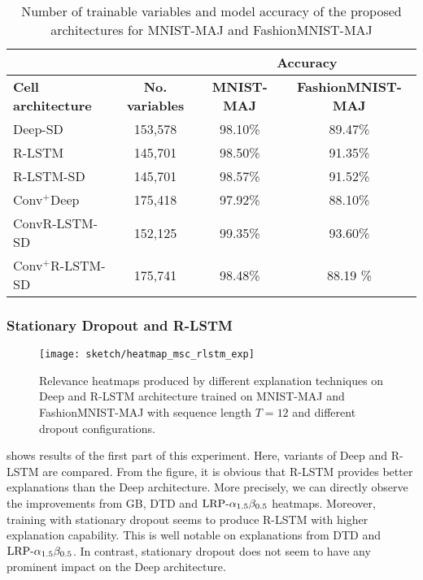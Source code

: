 \renewcommand{\arraystretch}{1.5}
\begin{table}[h]
\begin{center}
\begin{tabular}{lc|c|c|}
\cline{3-4}
& &
\multicolumn{2}{c|}{\parbox{3.5cm}{ \vskip 1mm \centering \textbf{Accuracy} \vskip 1mm}} \\ \hline
\multicolumn{1}{|l|}{\textbf{Cell architecture}} & \textbf{No. variables} & \textbf{MNIST-MAJ} & \textbf{FashionMNIST-MAJ} \\ \hline
\multicolumn{1}{|l|}{Deep-SD}                  & 153,578             & 98.10\% & 89.47\% \\ 
\multicolumn{1}{|l|}{R-LSTM}                    & 145,701   & 98.50\% & 91.35\% \\ 
\multicolumn{1}{|l|}{R-LSTM-SD}              &  145,701                & 98.57\% & 91.52\% \\ 
 \multicolumn{1}{|l|}{Conv$^+$Deep}       & 175,418                 & 97.92\% & 88.10\% \\
 \multicolumn{1}{|l|}{ConvR-LSTM-SD}      & 152,125                 & 99.35\% & 93.60\%  \\ 
\multicolumn{1}{|l|}{Conv$^+$R-LSTM-SD}   & 175,741                & 98.48\% & 88.19	\%  \\ \hline 
\end{tabular}

\end{center}
\caption{Number of trainable variables and model accuracy of the  proposed architectures for MNIST-MAJ and FashionMNIST-MAJ}
\label{tab:maj_exp3_model_acc}
\end{table}
\renewcommand{\arraystretch}{1}


\subsubsection{Stationary Dropout and R-LSTM}
 \begin{figure}[!htb]
\centering
\texttt{[image: sketch/heatmap\_msc\_rlstm\_exp]}
\caption{Relevance heatmaps produced by different explanation techniques on Deep and R-LSTM architecture trained on MNIST-MAJ and FashionMNIST-MAJ with sequence length $T=12$ and different dropout configurations. \heatmapscaleexplain} 
\label{fig:heatmap_msc_rlstm_exp}
\end{figure}

\addfigure{\ref{fig:heatmap_msc_rlstm_exp}} shows results of the first part of this experiment. Here, variants of Deep and R-LSTM are compared. From the figure, it is obvious that R-LSTM provides better explanations than the Deep architecture. More precisely, we can directly observe the improvements from GB, DTD and $\text{LRP-}\alpha_{1.5}\beta_{0.5}$ heatmaps. Moreover, training with stationary dropout seems to produce R-LSTM with higher explanation capability. This is well notable on explanations from  DTD and $\text{LRP-}\alpha_{1.5}\beta_{0.5}$. In contrast, stationary dropout does not seem to have any prominent impact on the Deep architecture.


